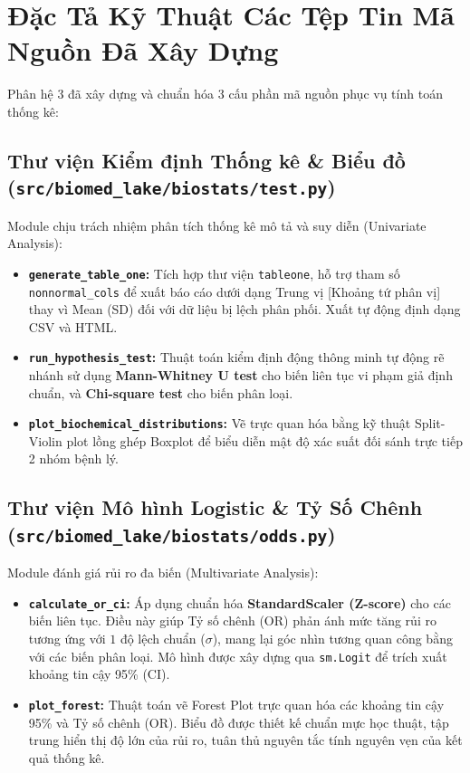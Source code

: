 \documentclass[11pt, a4paper]{article}
\begin{document}
\section{Đặc Tả Kỹ Thuật Các Tệp Tin Mã Nguồn Đã Xây Dựng}

Phân hệ 3 đã xây dựng và chuẩn hóa 3 cấu phần mã nguồn phục vụ tính toán thống kê:

\subsection{Thư viện Kiểm định Thống kê \& Biểu đồ (\texttt{src/biomed\_lake/biostats/test.py})}
Module chịu trách nhiệm phân tích thống kê mô tả và suy diễn (Univariate Analysis):
\begin{itemize}
    \item \textbf{\texttt{generate\_table\_one}:} Tích hợp thư viện \texttt{tableone}, hỗ trợ tham số \texttt{nonnormal\_cols} để xuất báo cáo dưới dạng Trung vị [Khoảng tứ phân vị] thay vì Mean (SD) đối với dữ liệu bị lệch phân phối. Xuất tự động định dạng CSV và HTML.
    \item \textbf{\texttt{run\_hypothesis\_test}:} Thuật toán kiểm định động thông minh tự động rẽ nhánh sử dụng \textbf{Mann-Whitney U test} cho biến liên tục vi phạm giả định chuẩn, và \textbf{Chi-square test} cho biến phân loại.
    \item \textbf{\texttt{plot\_biochemical\_distributions}:} Vẽ trực quan hóa bằng kỹ thuật Split-Violin plot lồng ghép Boxplot để biểu diễn mật độ xác suất đối sánh trực tiếp 2 nhóm bệnh lý.
\end{itemize}

\subsection{Thư viện Mô hình Logistic \& Tỷ Số Chênh (\texttt{src/biomed\_lake/biostats/odds.py})}
Module đánh giá rủi ro đa biến (Multivariate Analysis):
\begin{itemize}
    \item \textbf{\texttt{calculate\_or\_ci}:} Áp dụng chuẩn hóa \textbf{StandardScaler (Z-score)} cho các biến liên tục. Điều này giúp Tỷ số chênh (OR) phản ánh mức tăng rủi ro tương ứng với $1$ độ lệch chuẩn ($\sigma$), mang lại góc nhìn tương quan công bằng với các biến phân loại. Mô hình được xây dựng qua \texttt{sm.Logit} để trích xuất khoảng tin cậy 95\% (CI).
    \item \textbf{\texttt{plot\_forest}:} Thuật toán vẽ Forest Plot trực quan hóa các khoảng tin cậy 95\% và Tỷ số chênh (OR). Biểu đồ được thiết kế chuẩn mực học thuật, tập trung hiển thị độ lớn của rủi ro, tuân thủ nguyên tắc tính nguyên vẹn của kết quả thống kê.
\end{itemize}
\end{document}
